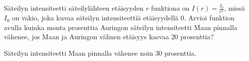 \begin{tehtavasivu}
\begin{tehtava}
Säteilyn intensiteetti säteilylähteen etäisyyden $ r $ funktiona on $ I(r)=\frac{I_{0}}{r^{2}}$, missä $I_{0}$ on vakio, joka kuvaa säteilyn intensiteettiä etäisyydellä $ 0 $. Arvioi funktion avulla kuinka monta prosenttia Auringon säteilyn intensiteetti Maan pinnalla vähenee, jos Maan ja Auringon välinen etäisyys kasvaa $ 20 $ prosenttia?
\begin{vastaus}
Säteilyn intensiteetti Maan pinnalla vähenee noin $ 30 $ prosenttia.
\end{vastaus}
\end{tehtava}

\end{tehtavasivu}
